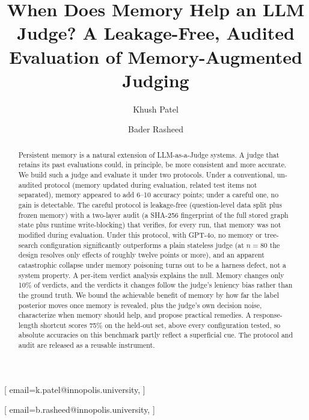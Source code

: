 \documentclass[]{ceurart}
\begin{document}


\title{When Does Memory Help an LLM Judge? A Leakage-Free,
  Audited Evaluation of Memory-Augmented Judging}

\author[1]{Khush Patel}[%
email=k.patel@innopolis.university,
]
\cormark[1]
\author[1]{Bader Rasheed}[%
email=b.rasheed@innopolis.university,
]
\address[1]{Innopolis University}

\begin{abstract}
Persistent memory is a natural extension of LLM-as-a-Judge systems. A judge that retains its past evaluations could, in principle, be more consistent and more accurate. We build such a judge and evaluate it under two protocols. Under a conventional, un-audited protocol (memory updated during evaluation, related test items not separated), memory appeared to add 6--10 accuracy points; under a careful one, no gain is detectable. The careful protocol is leakage-free (question-level data split plus frozen memory) with a two-layer audit (a SHA-256 fingerprint of the full stored graph state plus runtime write-blocking) that verifies, for every run, that memory was not modified during evaluation. Under this protocol, with GPT-4o, no memory or tree-search configuration significantly outperforms a plain stateless judge (at $n{=}80$ the design resolves only effects of roughly twelve points or more), and an apparent catastrophic collapse under memory poisoning turns out to be a harness defect, not a system property. A per-item verdict analysis explains the null. Memory changes only 10\% of verdicts, and the verdicts it changes follow the judge's leniency bias rather than the ground truth. We bound the achievable benefit of memory by how far the label posterior moves once memory is revealed, plus the judge's own decision noise, characterize when memory should help, and propose practical remedies. A response-length shortcut scores 75\% on the held-out set, above every configuration tested, so absolute accuracies on this benchmark partly reflect a superficial cue. The protocol and audit are released as a reusable instrument.
\end{abstract}
\end{document}

